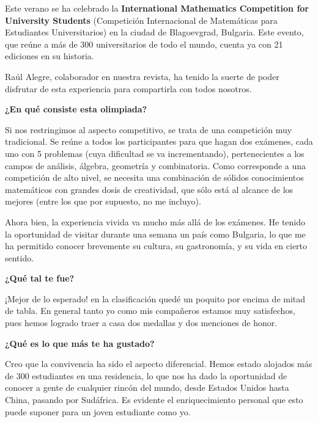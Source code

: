 \newenvironment{pregunta}{\vspace{10pt}\noindent \bfseries \Large}{\par\vspace{5pt}}

\cappar Este verano se ha celebrado la \textbf{International Mathematics Competition for University Students} (Competición Internacional de Matemáticas para Estudiantes Universitarios) en la ciudad de Blagoevgrad, Bulgaria. Este evento, que reúne a más de 300 universitarios de todo el mundo, cuenta ya con 21 ediciones en su historia.

\vspace{10pt}
Raúl Alegre, colaborador en nuestra revista, ha tenido la suerte de poder disfrutar de esta experiencia para compartirla con todos nosotros.

\begin{pregunta}
  ¿En qué consiste esta olimpiada?
\end{pregunta}
Si nos restringimos al aspecto competitivo, se trata de una competición muy tradicional. Se reúne a todos los participantes para que hagan dos exámenes, cada uno con 5 problemas (cuya dificultad se va incrementando), pertenecientes a los campos de análisis, álgebra, geometría y combinatoria. Como corresponde a una competición de alto nivel, se necesita una combinación de sólidos conocimientos matemáticos con grandes dosis de creatividad, que sólo está al alcance de los mejores (entre los que por supuesto, no me incluyo).

Ahora bien, la experiencia vivida va mucho más allá de los exámenes. He tenido la oportunidad de visitar durante una semana un país como Bulgaria, lo que me ha permitido conocer brevemente su cultura, su gastronomía, y su vida en cierto sentido.

\begin{pregunta}
  ¿Qué tal te fue?
\end{pregunta}
¡Mejor de lo esperado! en la clasificación quedé un poquito por encima de mitad de tabla. En general tanto yo como mis compañeros estamos muy satisfechos, pues hemos logrado traer a casa dos medallas y dos menciones de honor.


\begin{pregunta}
  ¿Qué es lo que más te ha gustado?
\end{pregunta}
Creo que la convivencia ha sido el aspecto diferencial. Hemos estado alojados más de 300 estudiantes en una residencia, lo que nos ha dado la oportunidad de conocer a gente de cualquier rincón del mundo, desde Estados Unidos hasta China, pasando por Sudáfrica. Es evidente el enriquecimiento personal que esto puede suponer para un joven estudiante como yo.

